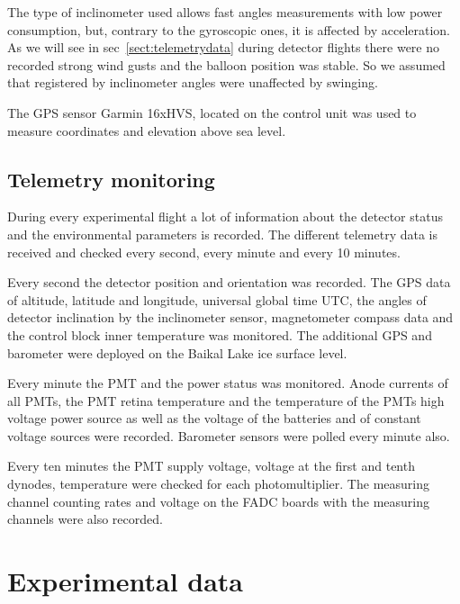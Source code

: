 \documentclass[final,5p,times,twocolumn]{elsarticle}
\begin{document}
The type of inclinometer used allows fast angles measurements with low power consumption, but, contrary to the gyroscopic ones, it is affected by acceleration. As we will see in sec~\ref{sect:telemetrydata} during detector flights there were no recorded strong wind gusts and the balloon position was stable. So we assumed that  registered by inclinometer angles were unaffected by swinging.

The GPS sensor Garmin 16xHVS, located on the control unit was used to measure coordinates and elevation above sea level.

\subsection{Telemetry monitoring\label{sect:telemetry}}
During every experimental flight a lot of information about the detector status and the environmental parameters is recorded. The different telemetry data is received and checked every second, every minute and every 10 minutes. 

Every second the detector position and orientation was recorded. The GPS data of altitude, latitude and longitude, universal global time UTC, the angles of detector inclination by the inclinometer sensor, magnetometer compass data and the control block inner temperature was monitored. The additional GPS and barometer were deployed on the Baikal Lake ice surface level.

Every minute the PMT and the power status was monitored. Anode currents of all PMTs, the PMT retina temperature and the temperature of the PMTs high voltage power source as well as the voltage of the batteries and of constant voltage sources were recorded. Barometer sensors were polled every minute also.

Every ten minutes the PMT supply voltage, voltage at the first and tenth dynodes, temperature were checked for each photomultiplier. The measuring channel counting rates and voltage on the FADC boards with the measuring channels were also recorded.


\section{Experimental data \label{sect:data}}
\label{sect:data}
 
\end{document}
